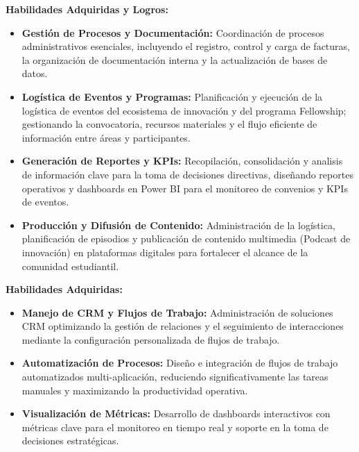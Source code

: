 \documentclass[10pt,a4paper]{altacv}
\begin{document}
\textbf{Habilidades Adquiridas y Logros:}
\vspace{-1mm}
\begin{justify}
\begin{itemize}

    \item \textbf{Gestión de Procesos y Documentación:} Coordinación de procesos administrativos esenciales, incluyendo el registro, control y carga de facturas, la organización de documentación interna y la actualización de bases de datos.
    \item \textbf{Logística de Eventos y Programas:} Planificación y ejecución de la logística de eventos del ecosistema de innovación y del programa Fellowship; gestionando la convocatoria, recursos materiales y el flujo eficiente de información entre áreas y participantes.
    \item \textbf{Generación de Reportes y KPIs:} Recopilación, consolidación y analisis de información clave para la toma de decisiones directivas, diseñando reportes operativos y dashboards en Power BI para el monitoreo de convenios y KPIs de eventos.
    \item \textbf{Producción y Difusión de Contenido:} Administración de la logística, planificación de episodios y publicación de contenido multimedia (Podcast de innovación) en plataformas digitales para fortalecer el alcance de la comunidad estudiantil.
    
\end{itemize}
\end{justify}


\textbf{Habilidades Adquiridas:}
\vspace{-1mm}
\begin{justify}
\begin{itemize}
    \item \textbf{Manejo de CRM y Flujos de Trabajo:} Administración de soluciones CRM optimizando la gestión de relaciones y el seguimiento de interacciones mediante la configuración personalizada de flujos de trabajo.
    \item \textbf{Automatización de Procesos:} Diseño e integración de flujos de trabajo automatizados multi-aplicación, reduciendo significativamente las tareas manuales y maximizando la productividad operativa.
    \item \textbf{Visualización de Métricas:} Desarrollo de dashboards interactivos con métricas clave para el monitoreo en tiempo real y soporte en la toma de decisiones estratégicas.
\end{itemize}
\end{justify}
\end{document}
